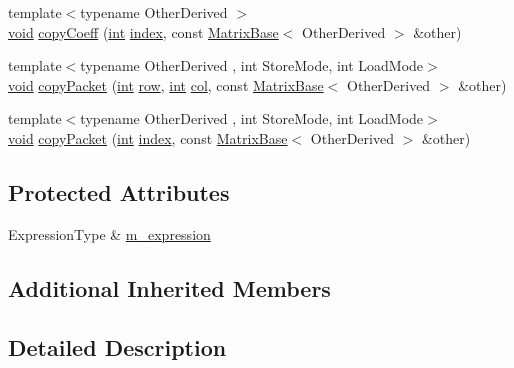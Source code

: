 \begin{DoxyCompactItemize}
\item 
{\footnotesize template$<$typename Other\-Derived $>$ }\\\hyperlink{group___u_a_v_objects_plugin_ga444cf2ff3f0ecbe028adce838d373f5c}{void} \hyperlink{class_swap_wrapper_a9943557a8efc4cf50e093db797334c9d}{copy\-Coeff} (\hyperlink{ioapi_8h_a787fa3cf048117ba7123753c1e74fcd6}{int} \hyperlink{glext_8h_ab47dd9958bcadea08866b42bf358e95e}{index}, const \hyperlink{class_matrix_base}{Matrix\-Base}$<$ Other\-Derived $>$ \&other)
\item 
{\footnotesize template$<$typename Other\-Derived , int Store\-Mode, int Load\-Mode$>$ }\\\hyperlink{group___u_a_v_objects_plugin_ga444cf2ff3f0ecbe028adce838d373f5c}{void} \hyperlink{class_swap_wrapper_ab5e384990f64466a92588d778c1cd2fe}{copy\-Packet} (\hyperlink{ioapi_8h_a787fa3cf048117ba7123753c1e74fcd6}{int} \hyperlink{glext_8h_a11b277b422822f784ee248b43eee3e1e}{row}, \hyperlink{ioapi_8h_a787fa3cf048117ba7123753c1e74fcd6}{int} \hyperlink{class_matrix_base_ae3c94b0f25b4273c7a8125169bdf60e0}{col}, const \hyperlink{class_matrix_base}{Matrix\-Base}$<$ Other\-Derived $>$ \&other)
\item 
{\footnotesize template$<$typename Other\-Derived , int Store\-Mode, int Load\-Mode$>$ }\\\hyperlink{group___u_a_v_objects_plugin_ga444cf2ff3f0ecbe028adce838d373f5c}{void} \hyperlink{class_swap_wrapper_aa1ca15ad74a4e64dc6e1db1a84f41183}{copy\-Packet} (\hyperlink{ioapi_8h_a787fa3cf048117ba7123753c1e74fcd6}{int} \hyperlink{glext_8h_ab47dd9958bcadea08866b42bf358e95e}{index}, const \hyperlink{class_matrix_base}{Matrix\-Base}$<$ Other\-Derived $>$ \&other)
\end{DoxyCompactItemize}
\subsection*{Protected Attributes}
\begin{DoxyCompactItemize}
\item 
Expression\-Type \& \hyperlink{class_swap_wrapper_acf4d8e44d721d62c81ffc1d1d9745a3e}{m\-\_\-expression}
\end{DoxyCompactItemize}
\subsection*{Additional Inherited Members}


\subsection{Detailed Description}
